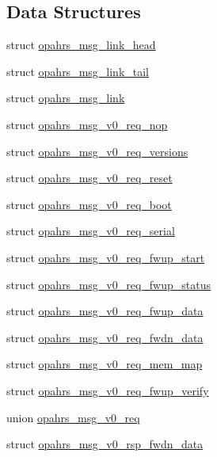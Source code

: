 \subsection*{Data Structures}
\begin{DoxyCompactItemize}
\item 
struct \hyperlink{structopahrs__msg__link__head}{opahrs\-\_\-msg\-\_\-link\-\_\-head}
\item 
struct \hyperlink{structopahrs__msg__link__tail}{opahrs\-\_\-msg\-\_\-link\-\_\-tail}
\item 
struct \hyperlink{structopahrs__msg__link}{opahrs\-\_\-msg\-\_\-link}
\item 
struct \hyperlink{structopahrs__msg__v0__req__nop}{opahrs\-\_\-msg\-\_\-v0\-\_\-req\-\_\-nop}
\item 
struct \hyperlink{structopahrs__msg__v0__req__versions}{opahrs\-\_\-msg\-\_\-v0\-\_\-req\-\_\-versions}
\item 
struct \hyperlink{structopahrs__msg__v0__req__reset}{opahrs\-\_\-msg\-\_\-v0\-\_\-req\-\_\-reset}
\item 
struct \hyperlink{structopahrs__msg__v0__req__boot}{opahrs\-\_\-msg\-\_\-v0\-\_\-req\-\_\-boot}
\item 
struct \hyperlink{structopahrs__msg__v0__req__serial}{opahrs\-\_\-msg\-\_\-v0\-\_\-req\-\_\-serial}
\item 
struct \hyperlink{structopahrs__msg__v0__req__fwup__start}{opahrs\-\_\-msg\-\_\-v0\-\_\-req\-\_\-fwup\-\_\-start}
\item 
struct \hyperlink{structopahrs__msg__v0__req__fwup__status}{opahrs\-\_\-msg\-\_\-v0\-\_\-req\-\_\-fwup\-\_\-status}
\item 
struct \hyperlink{structopahrs__msg__v0__req__fwup__data}{opahrs\-\_\-msg\-\_\-v0\-\_\-req\-\_\-fwup\-\_\-data}
\item 
struct \hyperlink{structopahrs__msg__v0__req__fwdn__data}{opahrs\-\_\-msg\-\_\-v0\-\_\-req\-\_\-fwdn\-\_\-data}
\item 
struct \hyperlink{structopahrs__msg__v0__req__mem__map}{opahrs\-\_\-msg\-\_\-v0\-\_\-req\-\_\-mem\-\_\-map}
\item 
struct \hyperlink{structopahrs__msg__v0__req__fwup__verify}{opahrs\-\_\-msg\-\_\-v0\-\_\-req\-\_\-fwup\-\_\-verify}
\item 
union \hyperlink{unionopahrs__msg__v0__req}{opahrs\-\_\-msg\-\_\-v0\-\_\-req}
\item 
struct \hyperlink{structopahrs__msg__v0__rsp__fwdn__data}{opahrs\-\_\-msg\-\_\-v0\-\_\-rsp\-\_\-fwdn\-\_\-data}

\end{DoxyCompactItemize}

